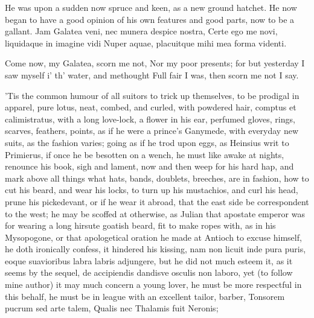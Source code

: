 He was upon a sudden now spruce and keen, as a new ground hatchet. He
now began to have a good opinion of his own features and good parts,
now to be a gallant.
Jam Galatea veni, nec munera despice nostra,
Certe ego me novi, liquidaque in imagine vidi
Nuper aquae, placuitque mihi mea forma videnti.

Come now, my Galatea, scorn me not,
Nor my poor presents; for but yesterday
I saw myself i' th' water, and methought
Full fair I was, then scorn me not I say.


'Tis the common humour of all suitors to trick up themselves, to be
prodigal in apparel, pure lotus, neat, combed, and curled, with
powdered hair, comptus et calimistratus, with a long love-lock, a
flower in his ear, perfumed gloves, rings, scarves, feathers, points,
\etc{} as if he were a prince's Ganymede, with everyday new suits, as the
fashion varies; going as if he trod upon eggs, as Heinsius writ to
Primierus, if once he be besotten on a wench, he must like awake
at nights, renounce his book, sigh and lament, now and then weep for
his hard hap, and mark above all things what hats, bands, doublets,
breeches, are in fashion, how to cut his beard, and wear his locks, to
turn up his mustachios, and curl his head, prune his pickedevant, or if
he wear it abroad, that the east side be correspondent to the west; he
may be scoffed at otherwise, as Julian that apostate emperor was for
wearing a long hirsute goatish beard, fit to make ropes with, as in his
Mysopogone, or that apologetical oration he made at Antioch to excuse
himself, he doth ironically confess, it hindered his kissing, nam non
licuit inde pura puris, eoque suavioribus labra labris adjungere, but
he did not much esteem it, as it seems by the sequel, de accipiendis
dandisve osculis non laboro, yet (to follow mine author) it may much
concern a young lover, he must be more respectful in this behalf, he
must be in league with an excellent tailor, barber,
Tonsorem pucrum sed arte talem,
Qualis nec Thalamis fuit Neronis;

